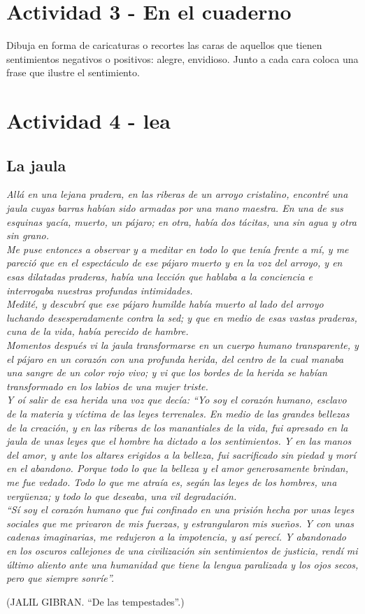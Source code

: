 \documentclass[10pt,twoside]{article}
\begin{document}
\section*{Actividad 3 - En el cuaderno}
Dibuja en forma de caricaturas o recortes las caras de aquellos
que tienen sentimientos negativos o positivos: alegre, envidioso.
Junto a cada cara coloca una frase que ilustre el sentimiento.
\section*{Actividad 4 - lea}
\subsection*{La jaula}
\textit{Allá en una lejana pradera, en las riberas de un arroyo cristalino, encontré una jaula cuyas barras habían sido armadas por una mano maestra. En una de sus esquinas yacía, muerto, un pájaro; en otra, había dos tácitas, una sin agua y otra sin grano.\\
Me puse entonces a observar y a meditar en todo lo que tenía frente a mí, y me pareció que en el espectáculo de ese pájaro muerto y en la voz del arroyo, y en esas dilatadas praderas,
había una lección que hablaba a la conciencia e interrogaba nuestras profundas intimidades.\\
Medité, y descubrí que ese pájaro humilde había muerto al lado del arroyo luchando desesperadamente contra la sed; y que en medio de esas vastas praderas, cuna de la vida, había perecido de hambre.\\
Momentos después vi la jaula transformarse en un cuerpo humano transparente, y el pájaro en un corazón con una profunda herida, del centro de la cual manaba una sangre de un color rojo vivo; y vi que los bordes de la herida se habían transformado en los labios de una mujer triste.\\
Y oí salir de esa herida una voz que decía: “Yo soy el corazón humano, esclavo de la materia y víctima de las leyes terrenales. En medio de las grandes bellezas de la creación, y en las riberas de los manantiales de la vida, fui apresado en la jaula de unas leyes que el hombre ha dictado a los sentimientos. Y en las manos del amor, y ante los altares erigidos a la belleza, fui sacrificado sin piedad y morí en el abandono. Porque todo lo
que la belleza y el amor generosamente brindan, me fue vedado. Todo lo que me atraía es, según las leyes de los hombres, una vergüenza; y todo lo que deseaba, una vil degradación.\\
“Sí soy el corazón humano que fui confinado en una prisión hecha por unas leyes sociales que me privaron de mis fuerzas, y estrangularon mis sueños. Y con unas cadenas imaginarias, me redujeron a la impotencia, y así perecí. Y abandonado en los oscuros callejones de una civilización sin sentimientos de justicia, rendí mi último aliento ante una humanidad que tiene la lengua paralizada y los ojos secos, pero que siempre sonríe”.}
\begin{flushright}
(JALIL GIBRAN. “De las tempestades”.)
\end{flushright}
\end{document}
